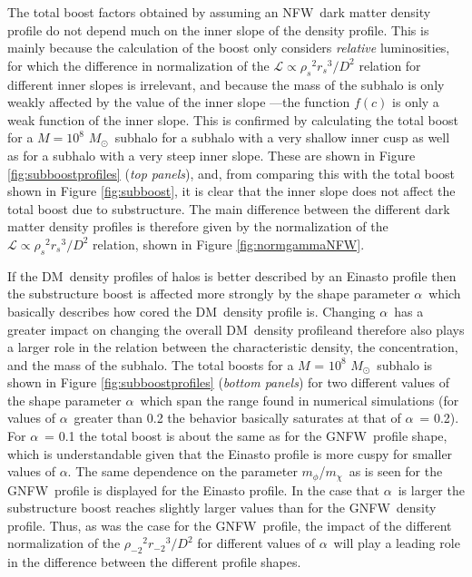 \documentclass[aps,prd,twocolumn,amsmath,amssymb,floatfix,nofootinbib,10pt]{revtex4}
\newcommand{\NFW}{NFW}
\newcommand{\GNFW}{G\NFW}
\newcommand{\DM}{DM}
\newcommand{\mdm}{\ensuremath{m_{\chi}}}
\newcommand{\mv}{\ensuremath{m_{\phi}}}
\newcommand{\lum}{\ensuremath{\mathcal{L}}}
\newcommand{\rhos}{\ensuremath{\rho_s}}
\newcommand{\rs}{\ensuremath{r_s}}
\newcommand{\dist}{\ensuremath{D}}
\newcommand{\rhominustwo}{\ensuremath{\rho_{-2}}}
\newcommand{\rminustwo}{\ensuremath{r_{-2}}}
\newcommand{\alphaEinasto}{\ensuremath{\alpha}}
\newcommand{\Msol}{\ensuremath{M_{\odot}}}
\newcommand{\Msun}{\Msol}
\begin{document}
\endgroup




The total boost factors obtained by assuming an \NFW\ dark matter
density profile do not depend much on the inner slope of the density
profile. This is mainly because the calculation of the boost only
considers \emph{relative} luminosities, for which the difference in
normalization of the $\lum \propto \rhos^2 \rs^3/\dist^2$ relation for
different inner slopes is irrelevant, and because the mass of the
subhalo is only weakly affected by the value of the inner slope ---the
function $f(c)$ is only a weak function of the inner slope. This is
confirmed by calculating the total boost for a $M = 10^8$ \Msun\
subhalo for a subhalo with a very shallow inner cusp as well as for a
subhalo with a very steep inner slope. These are shown in Figure
\ref{fig:subboostprofiles} (\emph{top panels}), and, from comparing
this with the total boost shown in Figure \ref{fig:subboost}, it is
clear that the inner slope does not affect the total boost due to
substructure. The main difference between the different dark matter
density profiles is therefore given by the normalization of the $\lum
\propto \rhos^2 \rs^3/\dist^2$ relation, shown in Figure
\ref{fig:normgammaNFW}.

If the \DM\ density profiles of halos is better described by an
Einasto profile then the substructure boost is affected more strongly
by the shape parameter \alphaEinasto\, which basically describes how
cored the \DM\ density profile is. Changing \alphaEinasto\ has a
greater impact on changing the overall \DM\ density profileand
therefore also plays a larger role in the relation between the
characteristic density, the concentration, and the mass of the
subhalo. The total boosts for a $M$ = $10^8$ \Msun\ subhalo is shown
in Figure \ref{fig:subboostprofiles} (\emph{bottom panels}) for two
different values of the shape parameter \alphaEinasto\, which span the
range found in numerical simulations (for values of \alphaEinasto\
greater than 0.2 the behavior basically saturates at that of
\alphaEinasto\ = 0.2). For \alphaEinasto\ = 0.1 the total boost is
about the same as for the \GNFW\ profile shape, which is
understandable given that the Einasto profile is more cuspy for
smaller values of \alphaEinasto. The same dependence on the parameter
\mv/\mdm\ as is seen for the \GNFW\ profile is displayed for the
Einasto profile. In the case that \alphaEinasto\ is larger the
substructure boost reaches slightly larger values than for the \GNFW\
density profile. Thus, as was the case for the \GNFW\ profile, the
impact of the different normalization of the
$\rhominustwo^2\rminustwo^3/\dist^2$ for different values of
\alphaEinasto\ will play a leading role in the difference between the
different profile shapes. 
\end{document}
